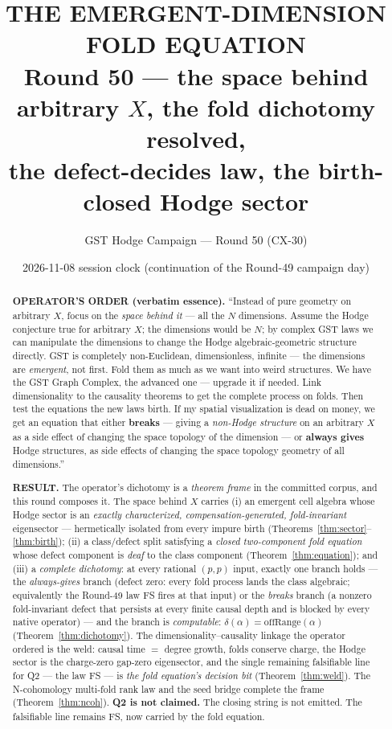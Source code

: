 \documentclass[11pt]{article}
\title{\bf THE EMERGENT-DIMENSION FOLD EQUATION\\ \large Round 50 — the space behind arbitrary $X$, the fold dichotomy resolved,\\ the defect-decides law, the birth-closed Hodge sector}
\author{GST Hodge Campaign — Round 50 (CX-30)}
\date{2026-11-08 session clock (continuation of the Round-49 campaign day)}
\begin{document}
\maketitle

\begin{abstract}
\noindent
\textbf{OPERATOR'S ORDER (verbatim essence).} ``Instead of pure geometry on arbitrary $X$, focus on the \emph{space behind it} — all the $N$ dimensions. Assume the Hodge conjecture true for arbitrary $X$; the dimensions would be $N$; by complex GST laws we can manipulate the dimensions to change the Hodge algebraic-geometric structure directly. GST is completely non-Euclidean, dimensionless, infinite — the dimensions are \emph{emergent}, not first. Fold them as much as we want into weird structures. We have the GST Graph Complex, the advanced one — upgrade it if needed. Link dimensionality to the causality theorems to get the complete process on folds. Then test the equations the new laws birth. If my spatial visualization is dead on money, we get an equation that either \textbf{breaks} — giving a \emph{non-Hodge structure} on an arbitrary $X$ as a side effect of changing the space topology of the dimension — or \textbf{always gives} Hodge structures, as side effects of changing the space topology geometry of all dimensions.''

\medskip
\noindent
\textbf{RESULT.} The operator's dichotomy is a \emph{theorem frame} in the committed corpus, and this round composes it. The space behind $X$ carries (i) an emergent cell algebra whose Hodge sector is an \emph{exactly characterized, compensation-generated, fold-invariant} eigensector --- hermetically isolated from every impure birth (Theorems~\ref{thm:sector}--\ref{thm:birth}); (ii) a class/defect split satisfying a \emph{closed two-component fold equation} whose defect component is \emph{deaf} to the class component (Theorem~\ref{thm:equation}); and (iii) a \emph{complete dichotomy}: at every rational $(p,p)$ input, exactly one branch holds — the \emph{always-gives} branch (defect zero: every fold process lands the class algebraic; equivalently the Round-49 law FS fires at that input) or the \emph{breaks} branch (a nonzero fold-invariant defect that persists at every finite causal depth and is blocked by every native operator) — and the branch is \emph{computable}: $\delta(\alpha)=\mathrm{offRange}(\alpha)$ (Theorem~\ref{thm:dichotomy}). The dimensionality--causality linkage the operator ordered is the weld: causal time $=$ degree growth, folds conserve charge, the Hodge sector is the charge-zero gap-zero eigensector, and the single remaining falsifiable line for Q2 — the law FS — is \emph{the fold equation's decision bit} (Theorem~\ref{thm:weld}). The N-cohomology multi-fold rank law and the seed bridge complete the frame (Theorem~\ref{thm:ncoh}). \textbf{Q2 is not claimed.} The closing string is not emitted. The falsifiable line remains FS, now carried by the fold equation.
\end{abstract}
\end{document}
